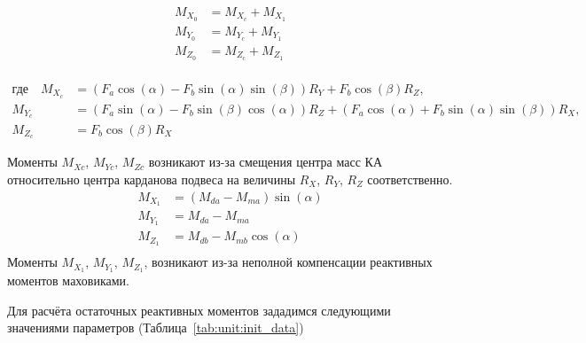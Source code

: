 \begin{samepage}
	\begin{equation}
		\label{eq:eq_M_sum}
		\begin{aligned}
			M_{X_0}&=M_{X_c}+M_{X_1} \\
			M_{Y_0}&=M_{Y_c}+M_{Y_1} \\
			M_{Z_0}&=M_{Z_c}+M_{Z_1} \\
		\end{aligned}	
	\end{equation}
	
	\begin{align*}
		\text{где} \quad
		M_{X_c} &= \left(F_a \cos(\alpha) - F_b \sin(\alpha) \sin(\beta)\right) R_Y + F_b \cos(\beta) R_Z, \\
		M_{Y_c} &= \left(F_a \sin(\alpha) - F_b \sin(\beta) \cos(\alpha)\right) R_Z + \left(F_a \cos(\alpha) + F_b \sin(\alpha) \sin(\beta)\right) R_X, \\
		M_{Z_c} &= F_b \cos(\beta) R_X
	\end{align*}
\end{samepage}

Моменты $M_{Xc}$, $M_{Yc}$, $M_{Zc}$ возникают из-за смещения центра масс КА относительно центра карданова подвеса на величины $R_X$, $R_Y$, $R_Z$ соответственно.
\begin{equation}
	\label{eq:eq_M1_proect}
	\begin{aligned}
		M_{X_1}&=(M_{da}-M_{ma})\sin(\alpha) \\
		M_{Y_1}&=M_{da}-M_{ma} \\
		M_{Z_1}&=M_{db}-M_{mb}\cos(\alpha) \\
	\end{aligned}	
\end{equation}
Моменты $M_{X_1}$, $M_{Y_1}$, $M_{Z_1}$, возникают из-за неполной компенсации реактивных моментов маховиками.

Для расчёта остаточных реактивных моментов зададимся следующими значениями параметров (Таблица~\cref{tab:unit:init_data})

